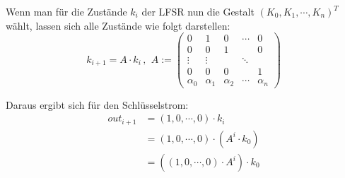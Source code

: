 Wenn man für die Zustände $k_i$ der LFSR nun die Gestalt $(K_0, K_1, \cdots, K_n)^T$ wählt, lassen sich alle Zustände wie folgt darstellen:
\begin{equation*}
	k_{i+1} = A \cdot k_i \, \text{,} \; \;
	A := \begin{pmatrix}
			0 & 1 & 0 & \cdots & 0 \\
			0 & 0 & 1 & & 0 \\
			\vdots & \vdots & & \ddots & \\
			0 & 0 & 0 & & 1 \\
			\alpha_0 & \alpha_1 & \alpha_2 & \cdots & \alpha_n
	\end{pmatrix}
\end{equation*}

Daraus ergibt sich für den Schlüsselstrom:
\begin{align*}
	out_{i+1}  & =  (1,0,\cdots,0) \cdot k_i \\ & = (1,0,\cdots,0) \cdot (A^i \cdot k_0) \\ & = ((1,0,\cdots,0) \cdot A^i) \cdot k_0
\end{align*}


